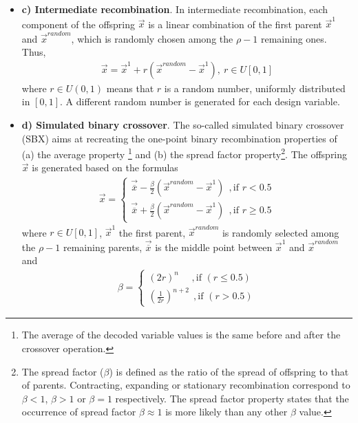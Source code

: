 \begin{itemize}
\FloatBarrier    
\item[]{\bf c) Intermediate recombination}.  In intermediate recombination, each component of the offspring $\vec{x}$ is a linear combination of the first parent $\vec{x}^1$ and $\vec{x}^{random}$, which is randomly chosen among the $\rho-1$ remaining ones. Thus,
\begin{eqnarray}
\nonumber
\vec{x}=\vec{x}^1+r(\vec{x}^{random}-\vec{x}^1),~ r\in U[0,1]
\end{eqnarray}  
where $r \in U(0,1)$ means that $r$ is a random number, uniformly distributed in $[0,1]$. A different random number is generated for each design variable.

\FloatBarrier 
\item[]{\bf d) Simulated binary crossover}. The so-called simulated binary crossover (SBX) \cite{SBX1} aims at recreating the one-point binary recombination properties of (a) the average property \footnote{The average of the decoded variable values is the same
before and after the crossover operation.} and (b) the spread factor property\footnote{The spread factor ($\beta$) is defined as the ratio of the spread of offspring to that of parents. Contracting, expanding or stationary recombination correspond to $\beta <1$, $\beta >1$ or $\beta =1$ respectively. The spread factor property states that the occurrence of spread factor $\beta \approx 1$ is more likely than any other $\beta$ value. }\cite{SBX1}. The offspring $\vec{x}$ is generated based on the formulas
\begin{eqnarray}
	\vec{x}={\left\{ 
	\begin{array}{ll}
    \vec{\overline{x}} - \frac{\beta}{2} (\vec{x}^{random}-\vec{x}^1)~~,\mbox{if $r < 0.5$}\\
	\vec{\overline{x}} + \frac{\beta}{2} (\vec{x}^{random}-\vec{x}^1)~~,\mbox{if $r \geq 0.5$}
    \end{array} \right. }
    \label{sbxx}
\end{eqnarray}  
where $r\in U[0,1]$, $\vec{x}^1$ the first parent, $\vec{x}^{random}$ is randomly selected among the $\rho-1$ remaining parents, $\vec{\overline{x}}$ is the middle point between $\vec{x}^{1}$ and $\vec{x}^{random}$ and 
\begin{eqnarray}
	\beta={\left\{ 
	\begin{array}{ll}
    (2r)^{n}~~~~~~,\mbox{if $(r \leq 0.5)$}\\
	\left(\frac{1}{2r}\right)^{n+2}~~,\mbox{if $(r > 0.5)$}
    \end{array} \right. }
    \label{betasbx}
\end{eqnarray}


\end{itemize}
